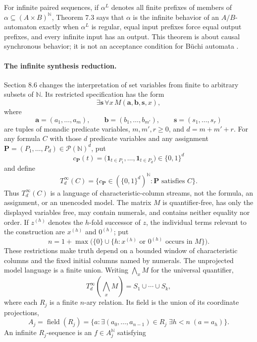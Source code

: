 For infinite paired sequences, if \(\alpha^L\) denotes all finite prefixes of
members of \(\alpha\subseteq(A\times B)^{\mathbb N}\), Theorem 7.3 says that
\(\alpha\) is the infinite behavior of an \(A/B\)-automaton exactly when
\(\alpha^L\) is regular, equal input prefixes force equal output prefixes, and
every infinite input has an output.  This theorem is about causal synchronous
behavior; it is not an acceptance condition for B\"uchi automata
\cite[pp.~43--44]{Elgot1961}.

\paragraph{The infinite synthesis reduction.}
Section 8.6 changes the interpretation of set variables from finite to
arbitrary subsets of \(\mathbb N\).  Its restricted specification has the form
\[
\exists\mathbf s\,\forall x\,
 M(\mathbf a,\mathbf b,\mathbf s,x),
\]
where
\[
 \mathbf a=(a_1,\ldots,a_m),\qquad
 \mathbf b=(b_1,\ldots,b_{m'}),\qquad
 \mathbf s=(s_1,\ldots,s_r)
\]
are tuples of monadic predicate variables, \(m,m',r\geq0\), and
\(d=m+m'+r\).  For any formula \(C\) with those \(d\) predicate variables
and any assignment \(\mathbf P=(P_1,\ldots,P_d)\in\mathcal P(\mathbb N)^d\),
put
\[
 c_{\mathbf P}(t)
   =\bigl(\mathbf 1_{t\in P_1},\ldots,
           \mathbf 1_{t\in P_d}\bigr)
   \in\{0,1\}^d
\]
and define
\[
 T_d^\infty(C)
 =\bigl\{c_{\mathbf P}\in(\{0,1\}^d)^{\mathbb N}:
          \mathbf P\text{ satisfies }C\bigr\}.
\]
Thus \(T_d^\infty(C)\) is a language of characteristic-column streams, not
the formula, an assignment, or an unencoded model.  The matrix \(M\) is
quantifier-free, has only the displayed variables free, may
contain numerals, and contains neither equality nor order.  If
\(z^{(h)}\) denotes the \(h\)-fold successor of \(z\), the individual terms
relevant to the construction are \(x^{(h)}\) and \(0^{(h)}\); put
\[
 n=1+\max\bigl(\{0\}\cup
       \{h:x^{(h)}\text{ or }0^{(h)}\text{ occurs in }M\}\bigr).
\]
These restrictions make truth depend on a bounded window of characteristic
columns and the fixed initial columns named by numerals.  The unprojected
model language is a finite union.  Writing \(\bigwedge_x M\) for the
universal quantifier,
\[
 T^\infty_d(\bigwedge_x M)
 =S_1\cup\cdots\cup S_k,
\]
where each \(R_j\) is a finite \(n\)-ary relation.  Its field is the union of
its coordinate projections,
\[
 A_j=\operatorname{field}(R_j)
 =\{a:\exists(a_0,\ldots,a_{n-1})\in R_j\;
             \exists h<n\;(a=a_h)\}.
\]
An infinite \(R_j\)-sequence is an
\(f\in A_j^{\mathbb N}\) satisfying
